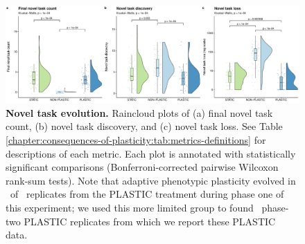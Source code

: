 \begin{figure}[ht!]
    \centering
    \includegraphics[width=\textwidth]{chapters/03-evolutionary-consequences-of-plasticity/media/complex-traits-magnitude-panel.pdf}
    \caption{\small
    \textbf{Novel task evolution.}
    Raincloud plots of 
    (a) final novel task count,
    (b) novel task discovery,
    and (c) novel task loss.
    See Table \ref{chapter:consequences-of-plasticity:tab:metrics-definitions} for descriptions of each metric.
    Each plot is annotated with statistically significant comparisons (Bonferroni-corrected pairwise Wilcoxon rank-sum tests).
    Note that adaptive phenotypic plasticity evolved in \novelTraitsPlasticReps\ of \novelTraitsReplicates\ replicates from the PLASTIC treatment during phase one of this experiment; 
    we used this more limited group to found \novelTraitsPlasticReps\ phase-two PLASTIC replicates from which we report these PLASTIC data.
    }
    \label{chapter:consequences-of-plasticity:fig:complex-traits-magnitude}
\end{figure}